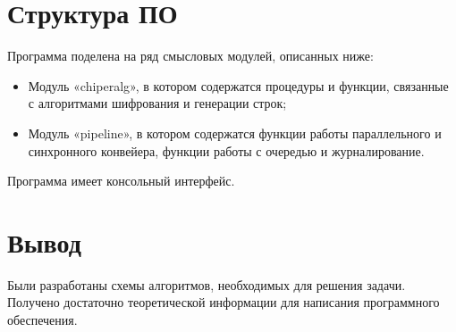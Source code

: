     \section{Структура ПО}
    \par Программа поделена на ряд смысловых модулей, описанных ниже:
    \begin{itemize}
        \item Модуль «chiperalg», в котором содержатся процедуры и функции, связанные с алгоритмами шифрования и генерации строк;

        \item Модуль «pipeline», в котором содержатся функции работы параллельного и синхронного конвейера, функции работы с очередью и журналирование.
    \end{itemize}

    Программа имеет консольный интерфейс.

	\section*{Вывод}
    \par Были разработаны схемы алгоритмов, необходимых для решения задачи. Получено достаточно теоретической информации для написания программного обеспечения.
\newpage